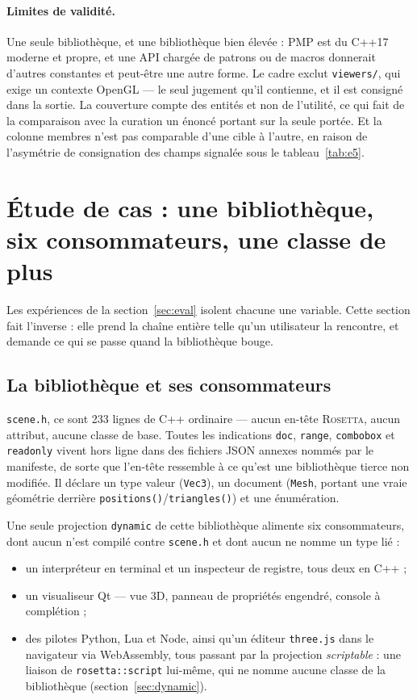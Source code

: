 \documentclass[11pt,a4paper]{article}
\newcommand{\rosetta}{\textsc{Rosetta}}
\newcommand{\code}[1]{\texttt{\small #1}}
\begin{document}
\paragraph{Limites de validité.} Une seule bibliothèque, et une bibliothèque bien
élevée : PMP est du C++17 moderne et propre, et une API chargée de patrons ou de
macros donnerait d'autres constantes et peut-être une autre forme. Le cadre exclut
\code{viewers/}, qui exige un contexte OpenGL --- le seul jugement qu'il
contienne, et il est consigné dans la sortie. La couverture compte des entités et
non de l'utilité, ce qui fait de la comparaison avec la curation un énoncé
portant sur la seule portée. Et la colonne \og membres \fg{} n'est pas comparable
d'une cible à l'autre, en raison de l'asymétrie de consignation des champs
signalée sous le tableau~\ref{tab:e5}.

\section{Étude de cas : une bibliothèque, six consommateurs, une classe de plus}
\label{sec:case}

Les expériences de la section~\ref{sec:eval} isolent chacune une variable. Cette
section fait l'inverse : elle prend la chaîne entière telle qu'un utilisateur la
rencontre, et demande ce qui se passe quand la bibliothèque bouge.

\subsection{La bibliothèque et ses consommateurs}

\code{scene.h}, ce sont 233 lignes de C++ ordinaire --- aucun en-tête
\rosetta{}, aucun attribut, aucune classe de base. Toutes les indications
\code{doc}, \code{range}, \code{combobox} et \code{readonly} vivent hors ligne
dans des fichiers JSON annexes nommés par le manifeste, de sorte que l'en-tête
ressemble à ce qu'est une bibliothèque tierce non modifiée. Il déclare un type
valeur (\code{Vec3}), un document (\code{Mesh}, portant une vraie géométrie
derrière \code{positions()}/\code{triangles()}) et une énumération.

Une seule projection \code{dynamic} de cette bibliothèque alimente six
consommateurs, dont aucun n'est compilé contre \code{scene.h} et dont aucun ne
nomme un type lié :

\begin{itemize}\setlength{\itemsep}{1pt}
  \item un interpréteur en terminal et un inspecteur de registre, tous deux en C++ ;
  \item un visualiseur Qt --- vue 3D, panneau de propriétés engendré, console à
        complétion ;
  \item des pilotes Python, Lua et Node, ainsi qu'un éditeur \code{three.js} dans
        le navigateur via WebAssembly, tous passant par la projection
        \emph{scriptable} : une liaison de \code{rosetta::script} lui-même, qui ne
        nomme aucune classe de la bibliothèque (section~\ref{sec:dynamic}).
\end{itemize}
\end{document}
